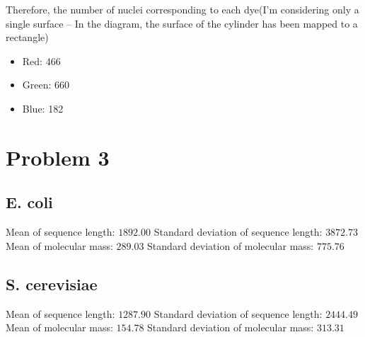 \documentclass[a4paper]{article}
\begin{document}
    Therefore, the number of nuclei corresponding to each dye(I'm considering only a single surface -- In the diagram, the surface of the cylinder has been mapped to a rectangle)
    \begin{itemize}
        \item Red: 466
        \item Green: 660
        \item Blue: 182
    \end{itemize}
\pagebreak
\section{Problem 3}
\subsection{E. coli}
Mean of sequence length: $1892.00$ \newline
Standard deviation of sequence length: $3872.73$ \newline
Mean of molecular mass: $289.03$ \newline
Standard deviation of molecular mass: $775.76$ \newline
\subsection{S. cerevisiae}
Mean of sequence length: $1287.90$ \newline
Standard deviation of sequence length: $2444.49$ \newline
Mean of molecular mass: $154.78$ \newline
Standard deviation of molecular mass: $313.31$ \newline
\end{document}
